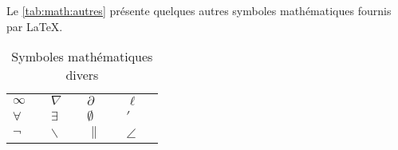 Le \autoref{tab:math:autres} présente quelques autres symboles
mathématiques fournis par {\LaTeX}.

\begin{table}[h]
  \caption{Symboles mathématiques divers}
  \label{tab:math:autres}
  \begin{tabularx}{1.0\linewidth}{lXlXlXlX}
    $\infty$ & \cmd{\infty} &
    $\nabla$ & \cmd{\nabla} &
    $\partial$ & \cmd{\partial} &
    $\ell$ & \cmd{\ell} \\
    $\forall$ & \cmd{\forall} &
    $\exists$ & \cmd{\exists} &
    $\emptyset$ & \cmd{\emptyset} &
    $\prime$ & \cmd{\prime} \\
    $\neg$ & \cmd{\neg} &
    $\backslash$ & \cmd{\backslash} &
    $\|$ & \cmd{\|} &
    $\angle$ & \cmd{\angle}
  \end{tabularx}
\end{table}


